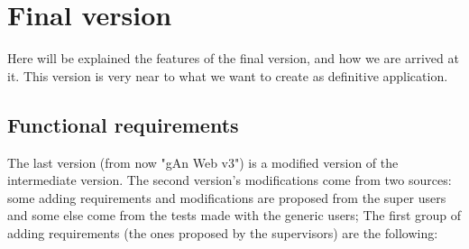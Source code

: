 
\chapter{Final version} %

\label{Chapter6} %

Here will be explained the features of the final version, and how we are arrived at it. This version is very near to what we want to create as definitive application.

\section{Functional requirements}

The last version (from now "gAn Web v3") is a modified version of the intermediate version. 
The second version's modifications come from two sources: some adding requirements and modifications are proposed from the super users and some else come from the tests made with the generic users; 
The first group of adding requirements (the ones proposed by the supervisors) are the following:

